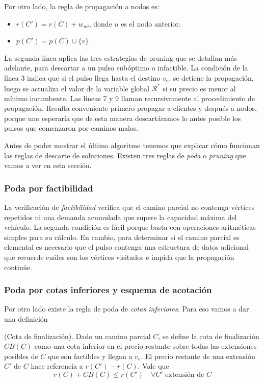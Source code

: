 Por otro lado, la regla de propagación a nodos es:
\begin{itemize}
    \item $r(C') = r(C) + w_{uv}$, donde $u$ es el nodo anterior.
    \item $p(C') = p(C) \cup \{v\}$
\end{itemize}


La segunda línea aplica las tres estrategias de pruning que se detallan más adelante, para descartar a un pulso subóptimo o infactible. La condición de la línea 3 indica que si el pulso llega hasta el destino $v_e$, se detiene la propagación, luego se actualiza el valor de la variable global $\mathscr{R}^{*}$ si su precio es menor al mínimo incumbente. Las líneas 7 y 9 llaman recursivamente al procedimiento de propagación. Resulta conveniente primero propagar a clientes y después a nodos, porque uno esperaría que de esta manera descartáramos lo antes posible los pulsos que comenzaron por caminos malos.

Antes de poder mostrar el último algoritmo tenemos que explicar cómo funcionan las reglas de descarte de soluciones. Existen tres reglas de \emph{poda} o \emph{pruning} que vamos a ver en esta sección.

\subsubsection{Poda por factibilidad}

La verificación de \emph{factibilidad} verifica que el camino parcial no contenga vértices repetidos ni una demanda acumulada que supere la capacidad máxima del vehículo. La segunda condición es fácil porque basta con operaciones aritméticas simples para su cálculo. En cambio, para determinar si el camino parcial es elemental es necesario que el pulso contenga una estructura de datos adicional que recuerde cuáles son los vértices visitados e impida que la propagación continúe.

\subsubsection{Poda por cotas inferiores y esquema de acotación}
\label{subsubsection:pulse-lower-bound}

Por otro lado existe la regla de poda de \emph{cotas inferiores}. Para eso vamos a dar una definición

\begin{definition}
    (Cota de finalización).
    Dado un camino parcial $C$, se define la cota de finalización $CB(C)$ como una cota inferior en el precio restante sobre todas las extensiones posibles de $C$  que son factibles y llegan a $v_e$. El precio restante de una extensión $C'$ de $C$ hace referencia a $r(C') - r(C)$. Vale que
    \begin{equation}
    \label{eq:completion-bound}
        r(C) + CB(C) \leq r(C') \quad \forall C' \text{ extensión de } C
    \end{equation}
\end{definition}

